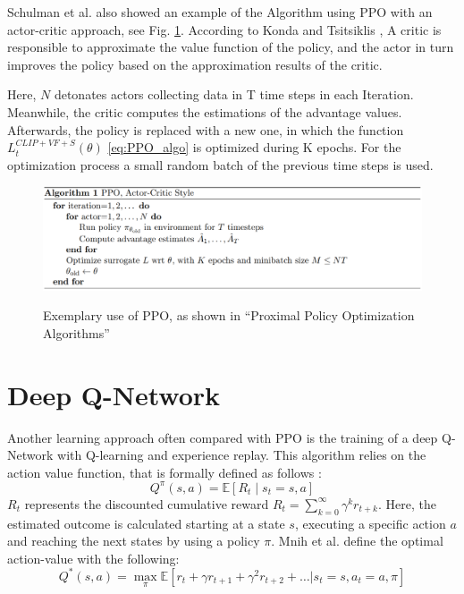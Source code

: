 Schulman et al. also showed an example of the Algorithm using PPO with an actor-critic approach, see Fig. \ref{fig:ppo_algo_code}. According to Konda and Tsitsiklis \cite{kots03}, A critic is responsible to approximate the value function of the policy, and the actor in turn improves the policy based on the approximation results of the critic.

Here, $N$ detonates actors collecting data in T time steps in each Iteration. Meanwhile, the critic computes the estimations of the advantage values. Afterwards, the policy is replaced with a new one, in which the function $L_{t}^{CLIP+VF+S}(\theta)$ \eqref{eq:PPO_algo} is optimized during K epochs. For the optimization process a small random batch of the previous time steps is used.
\begin{figure}[hpbt]
    \centering
    \includegraphics[width=1\textwidth]{pictures/ppo_algo_code.png}\\
    \caption[Exemplary Use Of PPO]{Exemplary use of PPO, as shown in ``Proximal Policy Optimization Algorithms'' \cite{scwo17}}\label{fig:ppo_algo_code}
\end{figure}

\section{Deep Q-Network}\label{dqn}
Another learning approach often compared with PPO is the training of a deep Q-Network with Q-learning and experience replay. This algorithm relies on the action value function, that is formally defined as follows \cite{mnba16}:
\begin{equation}\label{eq:qvalue}
    Q^\pi(s,a) = \mathbb{E} \left[ R_t \mid s_t = s,a \right]
\end{equation}
$R_t$ represents the discounted cumulative reward $R_t=\sum^{\infty}_{k=0} \gamma^k r_{t+k}$. Here, the estimated outcome is calculated starting at a state $s$, executing a specific action $a$ and reaching the next states by using a policy $\pi$. Mnih et al. \cite{mnka15} define the optimal action-value with the following:
\begin{equation}\label{eq:opt_qvalue}
    Q^*(s,a) =  \underset{\pi} \max \mathbb{E}\left[ r_{t} + \gamma r_{t+1} + \gamma^2 r_{t+2} + \ldots | s_t = s, a_t = a, \pi \right]
\end{equation}


